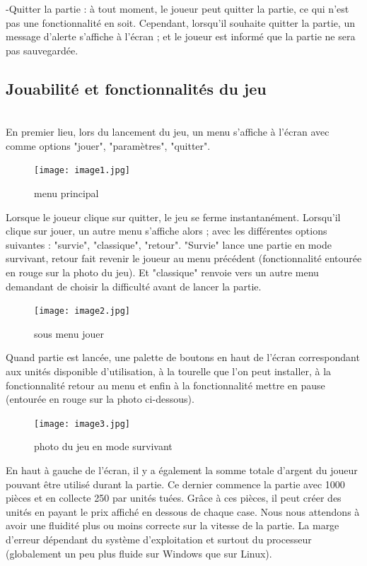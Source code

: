 \documentclass[a4paper,11pt]{article}
\begin{document}
-Quitter la partie : à tout moment, le joueur peut quitter la partie, ce qui n'est pas une fonctionnalité en soit. Cependant, lorsqu'il souhaite quitter la partie, un message d'alerte s'affiche à l'écran ; et le joueur est informé que la partie ne sera pas sauvegardée.\\

\subsection {Jouabilité et fonctionnalités du jeu}
\\
En premier lieu, lors du lancement du jeu, un menu s'affiche à l'écran avec comme options "jouer", "paramètres", "quitter".
\begin{figure}[ht!]
\centering
\texttt{[image: image1.jpg]} 
\caption {\label{image2} menu principal}
\end{figure}
 \smallbreak
Lorsque le joueur clique sur quitter, le jeu se ferme instantanément. Lorsqu'il clique sur jouer, un autre menu s'affiche alors ; avec les différentes options suivantes : "survie", "classique", "retour". "Survie" lance une partie en mode survivant, retour fait revenir le joueur au menu précédent (fonctionnalité entourée en rouge sur la photo du jeu). Et "classique" renvoie vers un autre menu demandant de choisir la difficulté avant de lancer la partie.
\begin{figure}[ht!]
\centering
\texttt{[image: image2.jpg]} 
\caption {\label{image3} sous menu jouer}
\end{figure}
 \smallbreak
Quand partie est lancée, une palette de boutons en haut de l'écran correspondant aux unités disponible d'utilisation, à la tourelle que l'on peut installer, à la fonctionnalité retour au menu et enfin à la fonctionnalité mettre en pause (entourée en rouge sur la photo ci-dessous).
\begin{figure}[ht!]
\centering
\texttt{[image: image3.jpg]} 
\caption {\label{image4} photo du jeu en mode survivant}
\end{figure}
 \smallbreak
En haut à gauche de l'écran, il y a également la somme totale d'argent du joueur pouvant être utilisé durant la partie. Ce dernier commence la partie avec 1000 pièces et en collecte 250 par unités tuées. Grâce à ces pièces, il peut créer des unités en payant le prix affiché en dessous de chaque case. Nous nous attendons à avoir une fluidité plus ou moins correcte sur la vitesse de la partie. La marge d'erreur dépendant du système d'exploitation et surtout du processeur (globalement un peu plus fluide sur Windows que sur Linux). 
\end{document}
